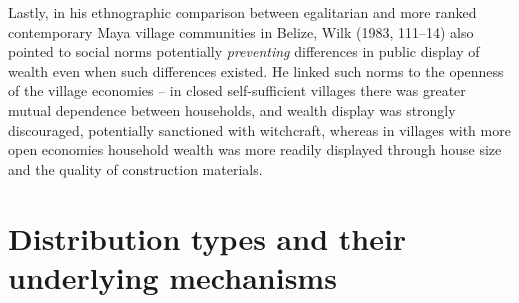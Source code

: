 \documentclass[
  12pt,
  a4paper, twoside]{book}
\begin{document}
Lastly, in his ethnographic comparison between egalitarian and more ranked contemporary Maya village communities in Belize, Wilk (1983, 111--14) also pointed to social norms potentially \emph{preventing} differences in public display of wealth even when such differences existed. He linked such norms to the openness of the village economies -- in closed self-sufficient villages there was greater mutual dependence between households, and wealth display was strongly discouraged, potentially sanctioned with witchcraft, whereas in villages with more open economies household wealth was more readily displayed through house size and the quality of construction materials.

\hypertarget{distributions}{%
\section{Distribution types and their underlying mechanisms}\label{distributions}}
\end{document}
